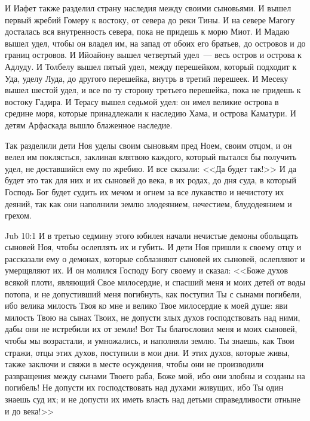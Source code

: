 И Иафет также разделил страну наследия между
своими сыновьями. И вышел первый жребий Гомеру к
востоку, от севера до реки Тины. И на севере
Магогу досталась вся внутренность севера, пока
не придешь к морю Миот. И Мадаю вышел удел, чтобы
он владел им, на запад от обоих его братьев, до
островов и до границ островов. И Ийоайону вышел
четвертый удел~--- весь остров и острова к Адлуду. И
Толбелу вышел пятый удел, между перешейком,
который подходит к Уда, уделу Луда, до другого
перешейка, внутрь в третий перешеек. И Месеку
вышел шестой удел, и все по ту сторону третьего
перешейка, пока не придешь к востоку Гадира. И
Терасу вышел седьмой удел: он имел великие
острова в средине моря, которые принадлежали к
наследию Хама, и острова Каматури. И детям
Арфаскада вышло блаженное наследие.

Так разделили дети Ноя уделы своим сыновьям
пред Ноем, своим отцом, и он велел им поклясться,
заклиная клятвою каждого, который пытался бы
получить удел, не доставшийся ему по жребию. И все
сказали: <<Да будет так!>> И да будет это так
для них и их сыновей до века, в их родах, до дня
суда, в который Господь Бог будет судить их мечом
и огнем за все лукавство и нечистоту их деяний,
так как они наполнили землю злодеянием,
нечестием, блудодеянием и грехом.

\vs Jub 10:1
И в третью седмину этого юбилея начали нечистые
демоны обольщать сыновей Ноя, чтобы ослеплять их
и губить. И дети Ноя пришли к своему отцу и
рассказали ему о демонах, которые соблазняют
сыновей их сыновей, ослепляют и умерщвляют их. И
он молился Господу Богу своему и сказал: <<Боже
духов всякой плоти, являющий Свое милосердие, и
спасший меня и моих детей от воды потопа, и не
допустивший меня погибнуть, как поступил Ты с
сынами погибели, ибо велика милость Твоя ко мне и
велико Твое милосердие к моей душе: яви милость
Твою на сынах Твоих, не допусти злых духов
господствовать над ними, дабы они не истребили их
от земли! Вот Ты благословил меня и моих сыновей,
чтобы мы возрастали, и умножались, и наполняли
землю. Ты знаешь, как Твои стражи, отцы этих духов,
поступили в мои дни. И этих духов, которые живы,
также заключи и свяжи в месте осуждения, чтобы
они не производили развращения между сынами
Твоего раба, Боже мой, ибо они злобны и созданы на
погибель! Не допусти их господствовать над
духами живущих, ибо Ты один знаешь суд их; и не
допусти их иметь власть над детьми
справедливости отныне и до века!>>


